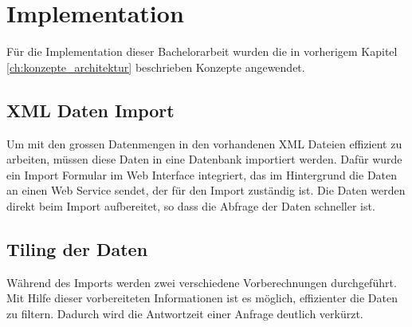 \chapter{Implementation}
Für die Implementation dieser Bachelorarbeit wurden die in vorherigem Kapitel \ref{ch:konzepte_architektur} beschrieben Konzepte angewendet.
\section{XML Daten Import}
Um mit den grossen Datenmengen in den vorhandenen XML Dateien effizient zu arbeiten, müssen diese Daten in eine Datenbank importiert werden. Dafür wurde ein Import Formular im Web Interface integriert, das im Hintergrund die Daten an einen Web Service sendet, der für den Import zuständig ist. Die Daten werden direkt beim Import aufbereitet, so dass die Abfrage der Daten schneller ist.
\section{Tiling der Daten}
\label{sec:tilingdataimplementation}
Während des Imports werden zwei verschiedene Vorberechnungen durchgeführt. Mit Hilfe dieser vorbereiteten Informationen ist es möglich, effizienter die Daten zu filtern. Dadurch wird die Antwortzeit einer Anfrage deutlich verkürzt.
